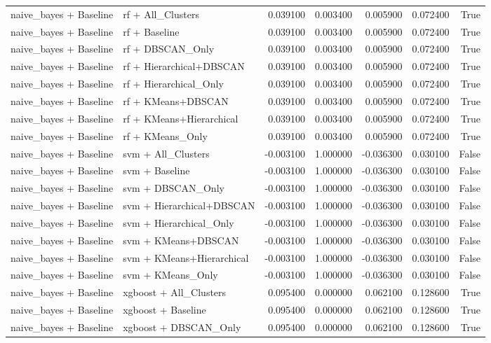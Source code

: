 \begin{tabular}{llrrrrr}
naive_bayes + Baseline & rf + All_Clusters & 0.039100 & 0.003400 & 0.005900 & 0.072400 & True \\
naive_bayes + Baseline & rf + Baseline & 0.039100 & 0.003400 & 0.005900 & 0.072400 & True \\
naive_bayes + Baseline & rf + DBSCAN_Only & 0.039100 & 0.003400 & 0.005900 & 0.072400 & True \\
naive_bayes + Baseline & rf + Hierarchical+DBSCAN & 0.039100 & 0.003400 & 0.005900 & 0.072400 & True \\
naive_bayes + Baseline & rf + Hierarchical_Only & 0.039100 & 0.003400 & 0.005900 & 0.072400 & True \\
naive_bayes + Baseline & rf + KMeans+DBSCAN & 0.039100 & 0.003400 & 0.005900 & 0.072400 & True \\
naive_bayes + Baseline & rf + KMeans+Hierarchical & 0.039100 & 0.003400 & 0.005900 & 0.072400 & True \\
naive_bayes + Baseline & rf + KMeans_Only & 0.039100 & 0.003400 & 0.005900 & 0.072400 & True \\
naive_bayes + Baseline & svm + All_Clusters & -0.003100 & 1.000000 & -0.036300 & 0.030100 & False \\
naive_bayes + Baseline & svm + Baseline & -0.003100 & 1.000000 & -0.036300 & 0.030100 & False \\
naive_bayes + Baseline & svm + DBSCAN_Only & -0.003100 & 1.000000 & -0.036300 & 0.030100 & False \\
naive_bayes + Baseline & svm + Hierarchical+DBSCAN & -0.003100 & 1.000000 & -0.036300 & 0.030100 & False \\
naive_bayes + Baseline & svm + Hierarchical_Only & -0.003100 & 1.000000 & -0.036300 & 0.030100 & False \\
naive_bayes + Baseline & svm + KMeans+DBSCAN & -0.003100 & 1.000000 & -0.036300 & 0.030100 & False \\
naive_bayes + Baseline & svm + KMeans+Hierarchical & -0.003100 & 1.000000 & -0.036300 & 0.030100 & False \\
naive_bayes + Baseline & svm + KMeans_Only & -0.003100 & 1.000000 & -0.036300 & 0.030100 & False \\
naive_bayes + Baseline & xgboost + All_Clusters & 0.095400 & 0.000000 & 0.062100 & 0.128600 & True \\
naive_bayes + Baseline & xgboost + Baseline & 0.095400 & 0.000000 & 0.062100 & 0.128600 & True \\
naive_bayes + Baseline & xgboost + DBSCAN_Only & 0.095400 & 0.000000 & 0.062100 & 0.128600 & True \\

\end{tabular}
